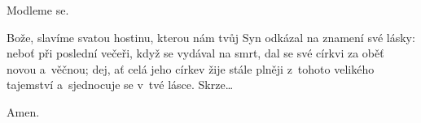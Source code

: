 \mbox{}

\Vbardot{} Modleme se.

Bože, slavíme svatou hostinu, kterou nám tvůj Syn odkázal na znamení své lásky: neboť při poslední večeři, když se vydával na smrt, dal se své církvi za oběť novou a~věčnou; dej, ať celá jeho církev žije stále plněji z~tohoto velikého tajemství a~sjednocuje se v~tvé lásce. Skrze…

\Rbardot{} Amen.
